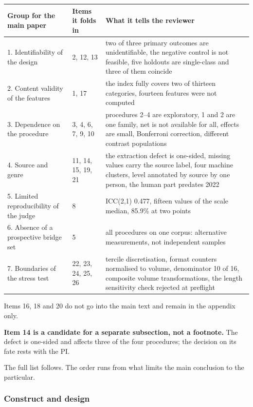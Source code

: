 \documentclass[11pt,a4paper]{article}
\renewcommand{\_}{\textunderscore\allowbreak}
\begin{document}
\begin{center}
\small
\begin{tabularx}{\textwidth}{llX}
\toprule
Group for the main paper & Items it folds in & What it tells the reviewer \\
\midrule
1. Identifiability of the design & 2, 12, 13 & two of three primary outcomes are unidentifiable, the negative control is not feasible, five holdouts are single-class and three of them coincide \\
2. Content validity of the features & 1, 17 & the index fully covers two of thirteen categories, fourteen features were not computed \\
3. Dependence on the procedure & 3, 4, 6, 7, 9, 10 & procedures 2–4 are exploratory, 1 and 2 are one family, net is not available for all, effects are small, Bonferroni correction, different contrast populations \\
4. Source and genre & 11, 14, 15, 19, 21 & the extraction defect is one-sided, missing values carry the source label, four machine clusters, level annotated by source by one person, the human part predates 2022 \\
5. Limited reproducibility of the judge & 8 & ICC(2,1) 0.477, fifteen values of the scale median, 85.9\% at two points \\
6. Absence of a prospective bridge set & 5 & all procedures on one corpus: alternative measurements, not independent samples \\
7. Boundaries of the stress test & 22, 23, 24, 25, 26 & tercile discretisation, format counters normalised to volume, denominator 10 of 16, composite volume transformations, the length sensitivity check rejected at preflight \\
\bottomrule
\end{tabularx}
\end{center}

Items 16, 18 and 20 do not go into the main text and remain in the appendix only.

\textbf{Item 14 is a candidate for a separate subsection, not a footnote.} The defect is one-sided and affects three of the four procedures; the decision on its fate rests with the PI.

The full list follows. The order runs from what limits the main conclusion to the particular.

\subsubsection{Construct and design}
\end{document}
